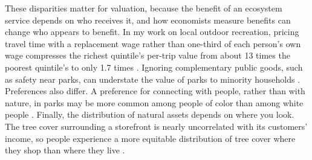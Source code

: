 \documentclass[12pt]{article}
\begin{document}
These disparities matter for valuation, because the benefit of an ecosystem service depends on who receives it, and how economists measure benefits can change who appears to benefit. In my work on local outdoor recreation, pricing travel time with a replacement wage rather than one-third of each person's own wage compresses the richest quintile's per-trip value from about 13 times the poorest quintile's to only 1.7 times \citep{creelNationalValueLocal2026}. Ignoring complementary public goods, such as safety near parks, can understate the value of parks to minority households \citep{albouy_unlocking_2020}. Preferences also differ. A preference for connecting with people, rather than with nature, in parks may be more common among people of color than among white people \citep{elmendorfUrbanParkForest2005}. Finally, the distribution of natural assets depends on where you look. The tree cover surrounding a storefront is nearly uncorrelated with its customers' income, so people experience a more equitable distribution of tree cover where they shop than where they live \citep{creelValueNatureBasedAdaptation2026}.



\end{document}
